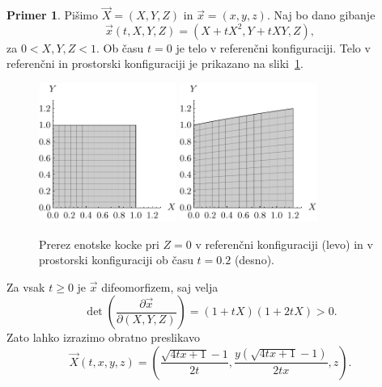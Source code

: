 \documentclass[12pt,a4paper,twoside]{article}
\theoremstyle{definition} %
\newtheorem{primer}[definicija]{Primer}
\theoremstyle{plain} %
\numberwithin{equation}{section}
\newcommand{\dpar}[2]{\ensuremath{\frac{\partial #1}{\partial #2}}}
\newcommand{\vX}{\vec{X}}
\newcommand{\vx}{\vec{x}}
\begin{document}
\begin{primer}
  \label{prim:gib}
  Pišimo $\vX = (X, Y, Z)$ in $\vx = (x, y, z)$. Naj bo dano gibanje
  \begin{equation}
    \vx(t, X, Y, Z) = (X + t X^2, Y + t X Y, Z),
  \end{equation}
  za $0 < X, Y, Z < 1$. Ob času $t=0$ je telo v referenčni konfiguraciji. Telo v referenčni in
  prostorski konfiguraciji je prikazano na sliki~\ref{fig:gibanje}.
  \begin{figure}[h]
    \centering
    \includegraphics[width=0.4\textwidth]{images/gibanje0.pdf}
    \hspace{1em}
    \includegraphics[width=0.4\textwidth]{images/gibanje02.pdf}
    \caption[Primer gibanja enotske kocke.]{Prerez enotske kocke pri $Z = 0$ v referenčni
      konfiguraciji (levo) in v prostorski konfiguraciji ob času $t=0.2$ (desno).}
    \label{fig:gibanje}
  \end{figure}
  Za vsak $t\geq 0$ je $\vx$ difeomorfizem, saj velja
  \begin{equation}
    \det\left( \dpar{\vx}{(X, Y, Z)} \right) = (1+tX)(1+2tX) > 0.
  \end{equation}
  Zato lahko izrazimo obratno preslikavo
  \begin{equation}
    \vX(t, x, y, z) = \left(\frac{\sqrt{4 t x+1}-1}{2 t}, \frac{y
    \left(\sqrt{4 t x+1}-1\right)}{2 t x}, z\right).
    \label{eq:gibanje-inv}
  \end{equation}
\end{primer}
\end{document}
